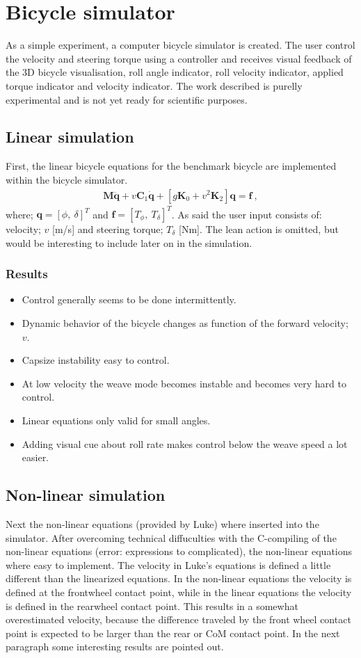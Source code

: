 \chapter{Bicycle simulator}
As a simple experiment, a computer bicycle simulator is created. The user control the velocity and steering torque using a controller and receives visual feedback of the 3D bicycle visualisation, roll angle indicator, roll velocity indicator, applied torque indicator and velocity indicator. The work described is purelly experimental and is not yet ready for scientific purposes. 
\section{Linear simulation}
First, the linear bicycle equations for the benchmark bicycle are implemented within the bicycle simulator. 
		\begin{align} 
		\mathbf{M}\ddot{\mathbf{q}} + v\mathbf{C}_1\dot{\mathbf{q} } + \left[g\mathbf{K}_0 + v^2\mathbf{K}_2\right]\mathbf{q} = \mathbf{f} \ ,
		\end{align}
where; $\mathbf{q} = \left[\phi , \ \delta \right]^T$ and $\mathbf{f} = \left[ T_\phi , \ T_\delta \right]^T$. As said the user input consists of: velocity; $v$ [m/s] and steering torque; $T_{\delta}$ [Nm]. The lean action is omitted, but would be interesting to include later on in the simulation.
\subsection{Results}
			\begin{itemize}
			\item Control generally seems to be done intermittently. 
			\item Dynamic behavior of the bicycle changes as function of the forward velocity; $v$.
			\item Capsize instability easy to control. 
			\item At low velocity the weave mode becomes instable and becomes very hard to control.
			\item Linear equations only valid for small angles.
			\item Adding visual cue about roll rate makes control below the weave speed a lot easier.
			\end{itemize}
\section{Non-linear simulation}
Next the non-linear equations (provided by Luke) where inserted into the simulator. After overcoming technical diffuculties with the C-compiling of the non-linear equations (error: expressions to complicated), the non-linear equations where easy to implement. The velocity in Luke's equations is defined a little different than the linearized equations. In the non-linear equations the velocity is defined at the frontwheel contact point, while in the linear equations the velocity is defined in the rearwheel contact point. This results in a somewhat overestimated velocity, because the difference traveled by the front wheel contact point is expected to be larger than the rear or CoM contact point. In the next paragraph some interesting results are pointed out.
